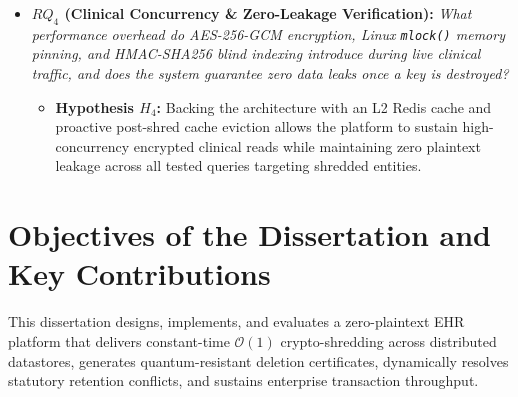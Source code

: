 \begin{itemize}
    \item \textbf{$RQ_4$ (Clinical Concurrency \& Zero-Leakage Verification):} 
    \textit{What performance overhead do AES-256-GCM encryption, Linux \texttt{mlock()} memory pinning, and HMAC-SHA256 blind indexing introduce during live clinical traffic, and does the system guarantee zero data leaks once a key is destroyed?}
    \begin{itemize}
        \item \textbf{Hypothesis $H_4$:} Backing the architecture with an L2 Redis cache and proactive post-shred cache eviction allows the platform to sustain high-concurrency encrypted clinical reads while maintaining zero plaintext leakage across all tested queries targeting shredded entities.
    \end{itemize}
\end{itemize}



\section{Objectives of the Dissertation and Key Contributions}\label{section:objectives}

This dissertation designs, implements, and evaluates a zero-plaintext EHR platform that delivers constant-time $\mathcal{O}(1)$ crypto-shredding across distributed datastores, generates quantum-resistant deletion certificates, dynamically resolves statutory retention conflicts, and sustains enterprise transaction throughput.

